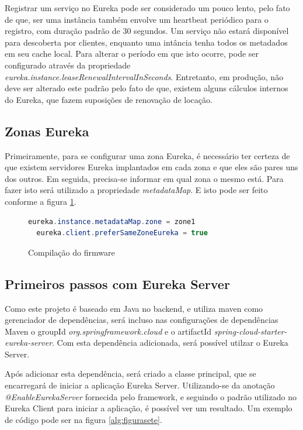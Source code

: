 \documentclass[journal]{IEEEtran}
\begin{document}
Registrar um serviço no Eureka pode ser considerado um pouco lento, pelo fato de que, ser uma instância também envolve um heartbeat periódico para o registro, com duração padrão de 30 segundos. Um serviço não estará disponível para descoberta por clientes, enquanto uma intância tenha todos os metadados em seu cache local. Para alterar o período em que isto ocorre, pode ser configurado através da propriedade \emph{eureka.instance.leaseRenewalIntervalInSeconds}. Entretanto, em produção, não deve ser alterado este padrão pelo fato de que, existem alguns cálculos internos do Eureka, que fazem suposições de renovação de locação.

\subsection{Zonas Eureka}

Primeiramente, para se configurar uma zona Eureka, é necessário ter certeza de que existem servidores Eureka implantados em cada zona e que eles são pares uns dos outros. Em seguida, precisa-se informar em qual zona o mesmo está. Para fazer isto será utilizado a propriedade \emph{metadataMap}. E isto pode ser feito conforme a figura \ref{alg:figuraseis}.

\begin{figure}[h]
\centering

\begin{lstlisting}[language=Java]
  eureka.instance.metadataMap.zone = zone1
  eureka.client.preferSameZoneEureka = true
\end{lstlisting}

\caption{Compilação do firmware}
\label{alg:figuraseis}
\end{figure}

\subsection{Primeiros passos com Eureka Server}

Como este projeto é baseado em Java no backend, e utiliza maven como gerenciador de dependências, será incluso nas configurações de dependências Maven o groupId \emph{org.springframework.cloud} e o artifactId \emph{spring-cloud-starter-eureka-server}. Com esta dependência adicionada, será possível utilzar o Eureka Server.

Após adicionar esta dependência, será criado a classe principal, que se encarregará de iniciar a aplicação Eureka Server. Utilizando-se da anotação \emph{@EnableEurekaServer} fornecida pelo framework, e seguindo o padrão utilizado no Eureka Client para iniciar a aplicação, é possível ver um resultado. Um exemplo de código pode ser na figura \ref{alg:figurasete}.
\end{document}
